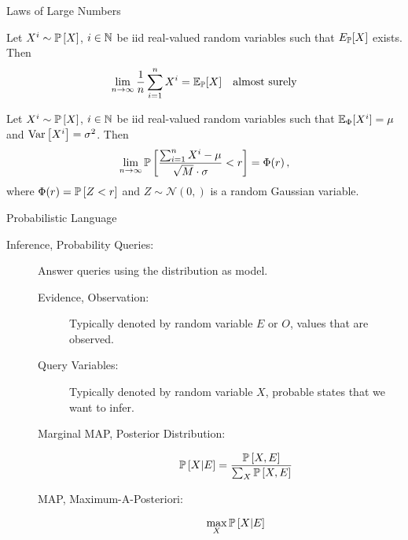 \begin{frame}{Laws of Large Numbers}
\begin{theorem}
Let $X^i \sim \Pb[X]$, $i \in \mathbb{N}$ be iid real-valued random variables such that $E_{\Pb}[X]$ exists.
Then
\begin{equation}
    \lim_{n \rightarrow \infty} \frac{1}{n} \sum_{i=1}^n X^i = \E_{\Pb}[X] \quad \text{almost surely}
\end{equation}
\end{theorem}
\begin{theorem}
Let $X^i \sim \Pb[X]$, $i \in \mathbb{N}$ be iid real-valued random variables such that $\E_{\Phi}[X^i] = \mu$ and $\mathrm{Var}\left[X^i\right] = \sigma^2$. 
Then
\begin{equation}
    \lim_{n \rightarrow \infty} \Pb[\frac{\sum_{i=1}^n X^i - \mu}{\sqrt{M} \cdot \sigma} < r] = \Phi(r) \,,
\end{equation}
where $\Phi(r) = \Pb[Z < r]$ and $Z \sim \mathcal{N}(0,)$ is a random Gaussian variable.
\end{theorem}
\end{frame}


\begin{frame}{Probabilistic Language}
\begin{description}
    \item[Inference, Probability Queries:] Answer queries using the distribution as model.
    \begin{description}
    \item[Evidence, Observation:] Typically denoted by random variable $E$ or $O$, values that are observed.
    \item[Query Variables:] Typically denoted by random variable $X$, probable states that we want to infer.
    \item[Marginal MAP, Posterior Distribution:]
    \begin{equation}
        \Pb[X|E] = \frac{\Pb[X,E]}{\sum_{X}\Pb[X,E]}
    \end{equation}
    \item[MAP, Maximum-A-Posteriori:] 
    \begin{equation}
    \max_{X} \Pb[X | E]
    \end{equation}
    \end{description}
\end{description}
\end{frame}

